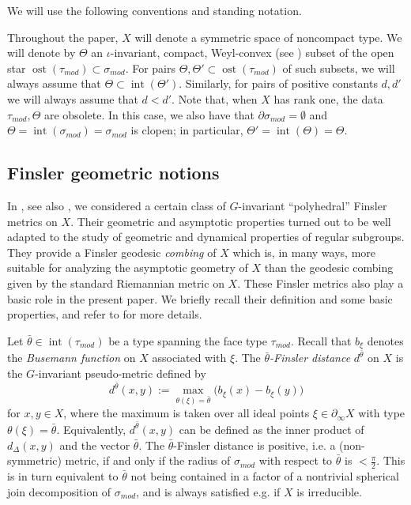 \documentclass[12pt]{article}
\theoremstyle{boldplain}
\theoremstyle{bolddefinition}
\numberwithin{equation}{section}
\def\si{\sigma}
\def\D{\partial}
\def\geo{\partial_{\infty}}
\def\inte{\operatorname{int}}
\def\pihalf{\frac{\pi}{2}}
\def\simod{\si_{mod}}
\def\ost{\operatorname{ost}}
\def\taumod{\tau_{mod}}
\begin{document}
We will use the following conventions and standing notation.

Throughout the paper, $X$ will denote a symmetric space of noncompact type.
We will denote by $\Theta$ an $\iota$-invariant, compact, Weyl-convex (see \cite[Def. 2.7]{anolec}) 
subset of the open star $\ost(\taumod)\subset\simod$. 
For pairs $\Theta,\Theta'\subset\ost(\taumod)$ of such subsets, we will always assume that $\Theta\subset\inte(\Theta')$. 
Similarly, for pairs of positive constants $d, d'$ we will always assume that $d< d'$. 
Note that, when $X$ has rank one, the data $\taumod, \Theta$ are obsolete. 
In this case, we also have that $\D\simod=\emptyset$ and $\Theta=\inte(\simod)=\simod$ is clopen; in particular, $\Theta'=\inte(\Theta)=\Theta$. 






\subsection{Finsler geometric notions}\label{sec:finsler}



In \cite{bordif}, see also \cite{anolec},
we considered a certain class of $G$-invariant ``polyhedral'' Finsler metrics on $X$.
Their geometric and asymptotic properties turned out to be well adapted 
to the study of geometric and dynamical properties of regular subgroups.
They provide a Finsler geodesic {\em combing} of $X$ which is, in many ways, more suitable for analyzing the asymptotic geometry of $X$ than the geodesic combing given by the standard Riemannian metric on $X$.
These Finsler metrics also play a basic role in the present paper.
We briefly recall their definition and some basic properties, 
and refer to \cite[\S 5.1]{bordif} for more details. 


Let $\bar\theta\in\inte(\taumod)$ be a type spanning the face type $\taumod$. {Recall that $b_\xi$ denotes the {\em Busemann function} on $X$ associated with $\xi$.} 
The {\em $\bar\theta$-Finsler distance} $d^{\bar\theta}$ on $X$ is the $G$-invariant pseudo-metric defined by
\begin{equation*}
d^{\bar\theta}(x,y) := \max_{\theta(\xi)=\bar\theta} \bigl( b_{\xi}(x)-b_{\xi}(y) \bigr) 
\end{equation*}
for $x,y\in X$, 
where the maximum is taken over all ideal points $\xi\in\geo X$ with type $\theta(\xi)=\bar\theta$.
{Equivalently, $d^{\bar\theta}(x,y)$ can be defined as the inner product of $d_\Delta(x,y)$ and the vector $\bar\theta$.} 
The  $\bar\theta$-Finsler distance is positive, i.e. a (non-symmetric) metric, 
if and only if the radius of $\simod$ with respect to $\bar\theta$ is $<\pihalf$.
This is in turn equivalent to $\bar\theta$ not being contained in a factor of a nontrivial spherical join decomposition of $\simod$,
and is always satisfied e.g. if $X$ is irreducible.
\end{document}
